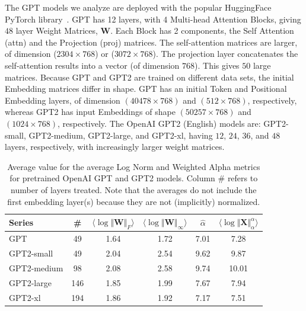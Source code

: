 The GPT models we analyze are deployed with the popular HuggingFace PyTorch library~\cite{huggingface}.
GPT has 12 layers, with 4 Multi-head Attention Blocks, giving $48$ layer Weight Matrices, $\mathbf{W}$.
Each Block has 2 components, the Self Attention (attn) and the Projection (proj) matrices.  
The self-attention  matrices are larger, of dimension ($2304\times 768$) or ($3072\times 768$).
The projection layer concatenates the self-attention results into a vector (of dimension $768$).
This gives $50$ large matrices.
%
Because GPT and GPT2 are trained on different data sets, the initial Embedding matrices differ in shape.
GPT has an initial Token and Positional Embedding layers, of dimension $(40478\times 768)$ and $(512\times 768)$, respectively, whereas GPT2 has input Embeddings of shape $(50257\times 768)$ and $(1024\times 768)$, respectively. 
%
The OpenAI GPT2 (English) models are: GPT2-small, GPT2-medium, GPT2-large, and GPT2-xl, having $12$, $24$, $36$, and $48$ layers, respectively, with increasingly larger weight matrices.


\begin{table}[t]
\small
\begin{center}
\begin{tabular}{|p{1in}|c|c|c|c|c|}
\hline
 Series  & \#   & $\langle\log\Vert\mathbf{W}\Vert_{F}\rangle$ & $\langle\log\Vert\mathbf{W}\Vert_{\infty}\rangle$ & $\hat{\alpha}$ & $\langle\log\Vert\mathbf{X}\Vert^{\alpha}_{\alpha}\rangle$ \\
\hline
GPT & 49 & 1.64  & 1.72 & 7.01 & 7.28 \\
GPT2-small & 49 & 2.04  & 2.54& 9.62 & 9.87 \\
\hline
GPT2-medium & 98 & 2.08 & 2.58& 9.74 & 10.01 \\
GPT2-large & 146 & 1.85 & 1.99& 7.67 & 7.94 \\
GPT2-xl & 194 & 1.86 & 1.92 & 7.17 & 7.51 \\
\hline
\end{tabular}
\end{center}
\caption{Average value for the average Log Norm and Weighted Alpha metrics for pretrained OpenAI GPT and GPT2 models. Column \# refers to number of layers treated.  Note that the averages do not include the first embedding layer(s) because they are not (implicitly) normalized.  }
\label{table:nlp}
\end{table}


